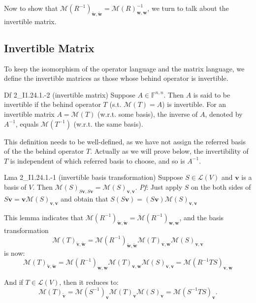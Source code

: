 \documentclass{article}
\newcommand{\basisTilde}[1]{\tilde{\pmb{#1}}}
\begin{document}
Now to show that $\mathcal{M}(R^{-1})_{\basisTilde{w}, \basisTilde{w}} = \mathcal{M}(R)^{-1}_{\pmb{w}, \pmb{w}}$, we turn to talk about the invertible matrix.

\subsection{Invertible Matrix}
To keep the isomorphism of the operator language and the matrix language, we define the invertible matrices as those whose behind operator is invertible.
\begin{Df}{Df 2\_I1.24.1.-2 (invertible matrix)}
    Suppose $A\in\mathbb{F}^{n,n}$. Then $A$ is said to be invertible if the behind operator $T$ (s.t. $\mathcal{M}(T) = A$) is invertible. For an invertible matrix $A = \mathcal{M}(T)$ (w.r.t. some basis), the inverse of $A$, denoted by $A^{-1}$, equals $\mathcal{M}(T^{-1})$ (w.r.t. the same basis).
\end{Df}
This definition needs to be well-defined, as we have not assign the referred basis of the the behind operator $T$. Actually as we will prove below, \textcolor{Th}{the invertibility of $T$ is independent of which referred basis to choose, and so is $A^{-1}$.}

\begin{Th}{Lma 2\_I1.24.1.-1 (invertible basis transformation)}
    Suppose $S\in\mathcal{L}(V)$ and $\pmb{v}$ is a basis of $V$. Then $\mathcal{M}(S)_{S\pmb{v}, S\pmb{v}} = \mathcal{M}(S)_{\pmb{v}, \pmb{v}}$.
    \tcblower
    \textit{Pf}: Just apply $S$ on the both sides of $S\pmb{v} = \pmb{v}\mathcal{M}(S)_{\pmb{v}, \pmb{v}}$ and obtain that $S(S\pmb{v}) = (S\pmb{v})\mathcal{M}(S)_{\pmb{v}, \pmb{v}}$
\end{Th}

This lemma indicates that $\mathcal{M}(R^{-1})_{\basisTilde{w}, \basisTilde{w}} = \mathcal{M}(R^{-1})_{\pmb{w}, \pmb{w}}$, and the basis transformation 
$$\mathcal{M}(T)_{\basisTilde{v}, \basisTilde{w}} = \mathcal{M}(R^{-1})_{\basisTilde{w}, \basisTilde{w}}\mathcal{M}(T)_{\pmb{v}, \pmb{w}}\mathcal{M}(S)_{\pmb{v}, \pmb{v}}$$
is now:
$$\mathcal{M}(T)_{\basisTilde{v}, \basisTilde{w}} = \mathcal{M}(R^{-1})_{\pmb{w}, \pmb{w}}\mathcal{M}(T)_{\pmb{v}, \pmb{w}}\mathcal{M}(S)_{\pmb{v}, \pmb{v}} = \mathcal{M}(R^{-1}TS)_{\pmb{v}, \pmb{w}}$$

And if $T\in\mathcal{L}(V)$, then it reduces to:
$$\mathcal{M}(T)_{\basisTilde{v}} = \mathcal{M}(S^{-1})_{\pmb{v}}\mathcal{M}(T)_{\pmb{v}}\mathcal{M}(S)_{\pmb{v}} = \mathcal{M}(S^{-1}TS)_{\pmb{v}}.$$
\end{document}
